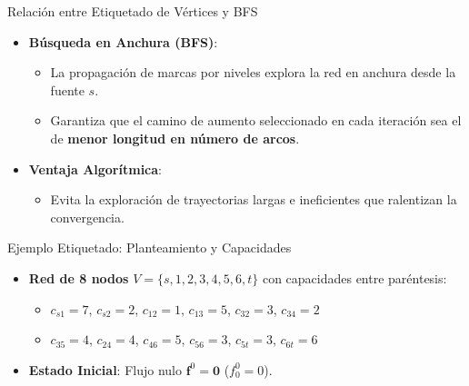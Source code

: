 \documentclass[
  ignorenonframetext,
]{beamer}
\providecommand{\tightlist}{%
  \setlength{\itemsep}{0pt}\setlength{\parskip}{0pt}}
\begin{document}
\begin{frame}{Relación entre Etiquetado de Vértices y BFS}
\label{relaciuxf3n-entre-etiquetado-de-vuxe9rtices-y-bfs}
\begin{itemize}
\tightlist
\item
  \textbf{Búsqueda en Anchura (BFS)}:

  \begin{itemize}
  \tightlist
  \item
    La propagación de marcas por niveles explora la red en anchura desde
    la fuente \(s\).
  \item
    Garantiza que el camino de aumento seleccionado en cada iteración
    sea el de \textbf{menor longitud en número de arcos}.
  \end{itemize}
\item
  \textbf{Ventaja Algorítmica}:

  \begin{itemize}
  \tightlist
  \item
    Evita la exploración de trayectorias largas e ineficientes que
    ralentizan la convergencia.
  \end{itemize}
\end{itemize}
\end{frame}

\begin{frame}{Ejemplo Etiquetado: Planteamiento y Capacidades}
\label{ejemplo-etiquetado-planteamiento-y-capacidades}
\begin{itemize}
\tightlist
\item
  \textbf{Red de 8 nodos} \(V = \{s, 1, 2, 3, 4, 5, 6, t\}\) con
  capacidades entre paréntesis:

  \begin{itemize}
  \tightlist
  \item
    \(c_{s1} = 7\), \(c_{s2} = 2\), \(c_{12} = 1\), \(c_{13} = 5\),
    \(c_{32} = 3\), \(c_{34} = 2\)
  \item
    \(c_{35} = 4\), \(c_{24} = 4\), \(c_{46} = 5\), \(c_{56} = 3\),
    \(c_{5t} = 3\), \(c_{6t} = 6\)
  \end{itemize}
\item
  \textbf{Estado Inicial}: Flujo nulo \(\mathbf{f}^0 = \mathbf{0}\)
  (\(f_0^0 = 0\)).
\end{itemize}
\end{frame}
\end{document}
